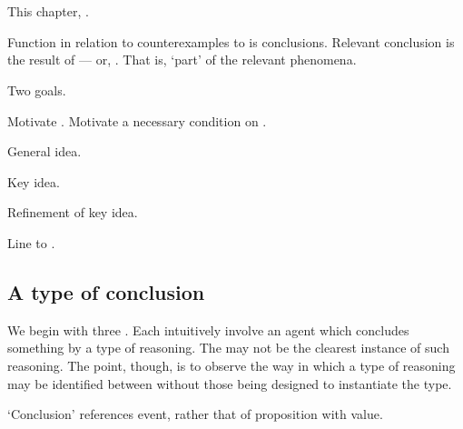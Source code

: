 \chapter{}
\label{cha:typical}
\nocite{Wilson:1994aa}

\begin{note}
  This chapter, \tC{}.

  Function in relation to counterexamples to \issueConstraint{} is conclusions.
  Relevant conclusion is the result of \tC{} --- or, \tC[reasoning]{}.
  That is, `part' of the relevant phenomena.

  Two goals.

  Motivate \tC{}.
  Motivate a necessary condition on \tC{}.
\end{note}

\begin{note}
  \begin{TOCEnum}
  \item

    General idea.
  \item

    Key idea.
  \item

    Refinement of key idea.
  \item

    Line \tC{} to .
  \end{TOCEnum}
\end{note}

\section{A type of conclusion}
\label{cha:typical:sec:g-s}

\begin{note}
  We begin with three .
  Each  intuitively involve an agent which concludes something by a type of reasoning.
  The  may not be the clearest instance of such reasoning.
  The point, though, is to observe the way in which a type of reasoning may be identified between  without those  being designed to instantiate the type.

  {
    \color{red}
    `Conclusion' references event, rather that \eval{} of proposition with value.
  }
\end{note}

